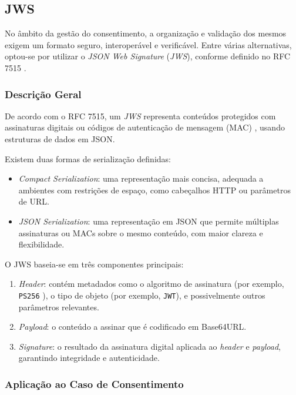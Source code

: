 \subsection{JWS}

No âmbito da gestão do consentimento, a organização e validação dos mesmos exigem um formato seguro, interoperável e verificável. Entre várias alternativas, optou-se por utilizar o \textit{JSON Web Signature} (\textit{JWS}), conforme definido no RFC 7515 \citep{rfc7515}.

\subsubsection{Descrição Geral}

De acordo com o RFC 7515, um \textit{JWS} representa conteúdos protegidos com assinaturas digitais ou códigos de autenticação de mensagem (MAC) \citep{NISTMAC}, usando estruturas de dados em JSON.

Existem duas formas de serialização definidas:

\begin{itemize}
  \item \textit{Compact Serialization}: uma representação mais concisa, adequada a ambientes com restrições de espaço, como cabeçalhos HTTP ou parâmetros de URL.
  \item \textit{JSON Serialization}: uma representação em JSON que permite múltiplas assinaturas ou MACs sobre o mesmo conteúdo, com maior clareza e flexibilidade.
\end{itemize}

O JWS baseia-se em três componentes principais:

\begin{enumerate}
  \item \textit{Header}: contém metadados como o algoritmo de assinatura (por exemplo, \texttt{PS256} \citep{Auth0SigningAlgorithms}
), o tipo de objeto (por exemplo, \texttt{JWT}), e possivelmente outros parâmetros relevantes.
  \item \textit{Payload}: o conteúdo a assinar que é codificado em Base64URL.
  \item \textit{Signature}: o resultado da assinatura digital aplicada ao \textit{header} e \textit{payload}, garantindo integridade e autenticidade.
\end{enumerate}

\subsubsection{Aplicação ao Caso de Consentimento}


